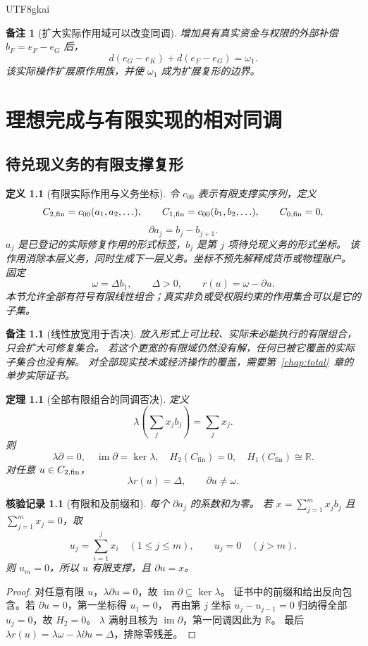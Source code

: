 \documentclass[12pt,a4paper,openany]{report}
\newtheorem{definition}{定义}[chapter]
\newtheorem{theorem}{定理}[chapter]
\newtheorem{remark}{备注}[chapter]
\newtheorem{Certificate}{核验记录}[chapter]
\numberwithin{equation}{chapter}
\newcommand{\RR}{\mathbb R}
\newcommand{\cfin}{C_{\mathrm{fin}}}
\newcommand{\im}{\operatorname{im}}
\begin{document}
\begin{CJK*}{UTF8}{gkai}
\begin{remark}[扩大实际作用域可以改变同调]
增加具有真实资金与权限的外部补偿 $b_F=e_F-e_G$ 后，
\[
 d(e_G-e_K)+d(e_F-e_G)=\omega_1.
\]
该实际操作扩展原作用族，并使 $\omega_1$ 成为扩展复形的边界。
\end{remark}

\chapter{理想完成与有限实现的相对同调}
\label{chap:completion}

\section{待兑现义务的有限支撑复形}

\begin{definition}[有限实际作用与义务坐标]
\label{def:cfin}
令 $c_{00}$ 表示有限支撑实序列，定义
\[
 C_{2,\rm fin}=c_{00}(a_1,a_2,\ldots),\qquad
 C_{1,\rm fin}=c_{00}(b_1,b_2,\ldots),\qquad C_{0,\rm fin}=0,
\]
\[
 \partial a_j=b_j-b_{j+1}.
\]
$a_j$ 是已登记的实际修复作用的形式标签，$b_j$ 是第 $j$ 项待兑现义务的形式坐标。
该作用消除本层义务，同时生成下一层义务。坐标不预先解释成货币或物理账户。
固定
\[
 \omega=\Delta b_1,\qquad \Delta>0,\qquad r(u)=\omega-\partial u.
\]
本节允许全部有符号有限线性组合；真实非负或受权限约束的作用集合可以是它的子集。
\end{definition}

\begin{remark}[线性放宽用于否决]
放入形式上可比较、实际未必能执行的有限组合，只会扩大可修复集合。
若这个更宽的有限域仍然没有解，任何已被它覆盖的实际子集合也没有解。
对全部现实技术或经济操作的覆盖，需要第~\ref{chap:total}~章的单步实际证书。
\end{remark}

\begin{theorem}[全部有限组合的同调否决]
\label{thm:finite-obstruction}
定义
\[
 \lambda\!\left(\sum_jx_jb_j\right)=\sum_jx_j.
\]
则
\[
 \lambda\partial=0,\quad
 \im\partial=\ker\lambda,\quad
 H_2(\cfin)=0,\quad H_1(\cfin)\cong\RR.
\]
对任意 $u\in C_{2,\rm fin}$，
\[
 \boxed{\lambda r(u)=\Delta,\qquad \partial u\ne\omega.}
\]
\end{theorem}
\begin{Certificate}[有限和及前缀和]
每个 $\partial a_j$ 的系数和为零。
若 $x=\sum_{j=1}^m x_jb_j$ 且 $\sum_{j=1}^m x_j=0$，取
\[
 u_j=\sum_{i=1}^j x_i\quad(1\le j\le m),\qquad u_j=0\quad(j>m).
\]
则 $u_m=0$，所以 $u$ 有限支撑，且 $\partial u=x$。
\end{Certificate}
\begin{proof}
对任意有限 $u$，$\lambda\partial u=0$，故 $\im\partial\subseteq\ker\lambda$。
证书中的前缀和给出反向包含。若 $\partial u=0$，第一坐标得 $u_1=0$，
再由第 $j$ 坐标 $u_j-u_{j-1}=0$ 归纳得全部 $u_j=0$，故 $H_2=0$。
$\lambda$ 满射且核为 $\im\partial$，第一同调因此为 $\RR$。
最后 $\lambda r(u)=\lambda\omega-\lambda\partial u=\Delta$，排除零残差。
\end{proof}


\end{CJK*}
\end{document}
